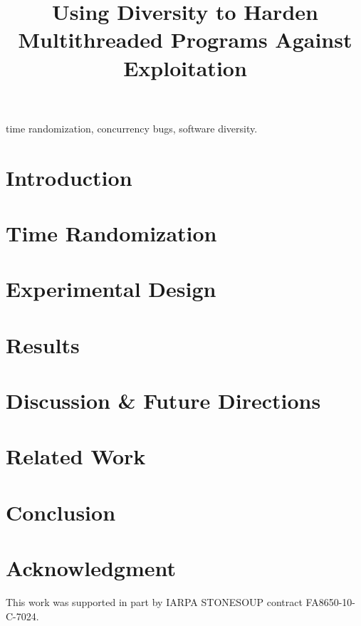 \documentclass[10pt,conference,compsocconf]{IEEEtran}
\begin{document}
\title{Using Diversity to Harden Multithreaded Programs Against Exploitation}

\author{
	\and
}

\maketitle

\begin{abstract}

\end{abstract}

\begin{IEEEkeywords}
time randomization, concurrency bugs, software diversity.
\end{IEEEkeywords}

\section{Introduction}


\section{Time Randomization}\label{time-randomization}


\section{Experimental Design}\label{experiment}


\section{Results}\label{results}


\section{Discussion \& Future Directions}\label{future}


\section{Related Work}


\section{Conclusion}


\section{Acknowledgment}
This work was supported in part by IARPA STONESOUP contract FA8650-10-C-7024.

\balance


\end{document}
